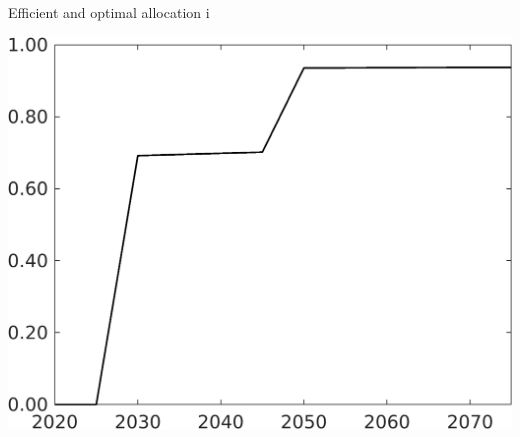 \documentclass[11pt,aspectratio=169]{beamer}
\begin{document}
\begin{frame}{Efficient and optimal allocation i}
	\centering
	\begin{minipage}[]{0.32\textwidth}
		\includegraphics[width=1\textwidth]{../codding_model/own_basedOnFried/optimalPol_elastS_DisuSci/figures/all_1705/tauf_CompEffSP_T_onlyeff_spillover0_noskill0_sep1_BN0_ineq0_red0_xgrowth0_zero0_countec0_etaa0.79_lgd0.png}
	\end{minipage}
	\begin{minipage}[]{0.05\textwidth}
		\ \ \\ 
		\ \ 
	\end{minipage}
	\begin{minipage}[]{0.32\textwidth}

\end{minipage}
\end{frame}
\end{document}
